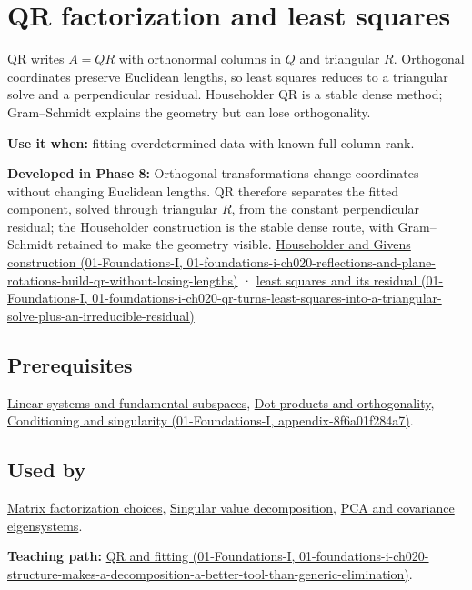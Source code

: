 \hypertarget{appendix-c3421e6b4f2c}{}
\section{QR factorization and least squares}\label{appendix-c3421e6b4f2c-qr-factorization-and-least-squares}

QR writes \(A=QR\) with orthonormal columns in \(Q\) and triangular \(R\). Orthogonal coordinates preserve Euclidean lengths, so least squares reduces to a triangular solve and a perpendicular residual. Householder QR is a stable dense method; Gram--Schmidt explains the geometry but can lose orthogonality.

\textbf{Use it when:} fitting overdetermined data with known full column rank.

\textbf{Developed in Phase 8:} Orthogonal transformations change coordinates without changing Euclidean lengths. QR therefore separates the fitted component, solved through triangular \(R\), from the constant perpendicular residual; the Householder construction is the stable dense route, with Gram--Schmidt retained to make the geometry visible. \href{../01-Foundations-I/main.pdf\#nameddest=01-foundations-i-ch020-reflections-and-plane-rotations-build-qr-without-losing-lengths}{Householder and Givens construction (01-Foundations-I, 01-foundations-i-ch020-reflections-and-plane-rotations-build-qr-without-losing-lengths)} · \href{../01-Foundations-I/main.pdf\#nameddest=01-foundations-i-ch020-qr-turns-least-squares-into-a-triangular-solve-plus-an-irreducible-residual}{least squares and its residual (01-Foundations-I, 01-foundations-i-ch020-qr-turns-least-squares-into-a-triangular-solve-plus-an-irreducible-residual)}

\subsection{Prerequisites}\label{appendix-c3421e6b4f2c-prerequisites}

\hyperref[appendix-8572a4a060c1]{Linear systems and fundamental subspaces}, \hyperref[appendix-8bc4e8fc547c]{Dot products and orthogonality}, \href{../01-Foundations-I/main.pdf\#nameddest=appendix-8f6a01f284a7}{Conditioning and singularity (01-Foundations-I, appendix-8f6a01f284a7)}.

\subsection{Used by}\label{appendix-c3421e6b4f2c-used-by}

\hyperref[appendix-221a483bec2d]{Matrix factorization choices}, \hyperref[appendix-1fad5e7f36fa]{Singular value decomposition}, \hyperref[appendix-ad175ef3c5bf]{PCA and covariance eigensystems}.

\textbf{Teaching path:} \href{../01-Foundations-I/main.pdf\#nameddest=01-foundations-i-ch020-structure-makes-a-decomposition-a-better-tool-than-generic-elimination}{QR and fitting (01-Foundations-I, 01-foundations-i-ch020-structure-makes-a-decomposition-a-better-tool-than-generic-elimination)}.
